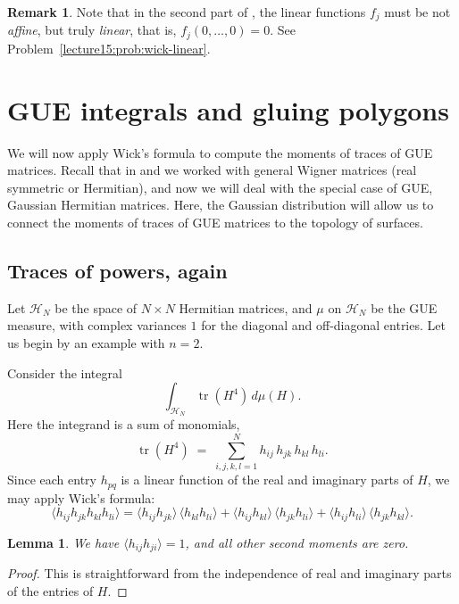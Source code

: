 \documentclass[letterpaper,11pt,oneside,reqno]{book}
\numberwithin{equation}{chapter}  %
\newtheorem{lemma}[proposition]{Lemma}
\theoremstyle{definition}
\newtheorem{remark}[proposition]{Remark}
\begin{document}
\begin{remark}
	\label{lecture15:rem:wick-linear}
	Note that in the second part of ,
	the linear functions $f_j$ must be not \emph{affine}, but truly \emph{linear},
	that is, $f_j(0,\ldots,0)=0$. See Problem~\ref{lecture15:prob:wick-linear}.
\end{remark}


\section{GUE integrals and gluing polygons}

We will now apply Wick’s formula to compute the moments of traces of
GUE matrices. Recall that in
and
 we
worked with general Wigner matrices (real symmetric or Hermitian),
and now we will deal with the special case of
GUE, Gaussian Hermitian matrices.
Here, the Gaussian distribution will allow us to
connect the moments of traces of GUE matrices to the topology of surfaces.

\subsection{Traces of powers, again}
\label{lecture15:subsec:traces-powers}


Let $\mathcal{H}_N$ be the space of $N\times N$ Hermitian matrices,
and $\mu$ on $\mathcal{H}_N$ be the GUE measure, with complex variances $1$
for the diagonal and off-diagonal entries.
Let us begin by an example with $n=2$.

Consider the integral
\[
  \int_{\mathcal{H}_N}\!\operatorname{tr}(H^4)\,d\mu(H).
\]
Here the integrand is a sum of monomials,
\[
  \operatorname{tr}(H^4)
  \;=\;
  \sum_{i,j,k,l=1}^N
    h_{ij}\,h_{jk}\,h_{kl}\,h_{li}.
\]
Since each entry $h_{pq}$ is a linear function of the real and imaginary parts
of $H$, we may apply Wick’s formula:
\begin{equation}\label{lecture15:eq:wick-square}
  \bigl\langle h_{ij}h_{jk}h_{kl}h_{li}\bigr\rangle
  =
  \langle h_{ij}h_{jk}\rangle\,\langle h_{kl}h_{li}\rangle
  +
  \langle h_{ij}h_{kl}\rangle\,\langle h_{jk}h_{li}\rangle
  +
  \langle h_{ij}h_{li}\rangle\,\langle h_{jk}h_{kl}\rangle.
\end{equation}
\begin{lemma}
	We have $\langle h_{ij}h_{ji} \rangle =1$, and all other
	second moments are zero.
\end{lemma}
\begin{proof}
	This is straightforward from the independence of real and imaginary parts of the entries of $H$.
\end{proof}
\end{document}
